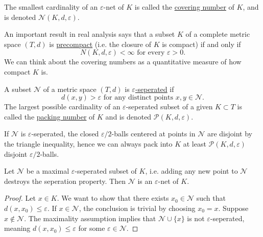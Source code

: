 \begin{definition}[]
\label{def:4.2.2}
The smallest cardinality of an $\varepsilon$-net of $K$ is called the \underline{covering number} of 
$K$, and is denoted $\mathcal{N}(K, d, \varepsilon)$.
\end{definition}

\begin{remark}[Compactness]
\label{rmk:4.2.3}
An important result in real analysis says that a subset $K$ of a complete metric space $(T, d)$ is 
\underline{precompact} (i.e. the closure of $K$ is compact) if and only if
\[ N(K, d, \varepsilon) < \infty \text{ for every } \varepsilon > 0. \]
We can think about the covering numbers as a quantitative measure of how compact $K$ is.
\end{remark}

\begin{definition}[]
\label{def:4.2.4}
A subset $\mathcal{N}$ of a metric space $(T, d)$ is \underline{$\varepsilon$-seperated} if 
\[ d(x, y) > \varepsilon \text{ for any distinct points } x, y \in \mathcal{N}. \]
The largest possible cardinality of an $\varepsilon$-seperated subset of a given $K \subset T$ is called 
the \underline{packing number} of $K$ and is denoted $\mathcal{P}(K, d, \varepsilon)$.
\end{definition}

\begin{remark}
\label{rmk:4.2.5}
If $\mathcal{N}$ is $\varepsilon$-seperated, the closed $\varepsilon / 2$-balls centered at points in 
$\mathcal{N}$ are disjoint by the triangle inequality, hence we can always pack into $K$ at least 
$\mathcal{P}(K, d, \varepsilon)$ disjoint $\varepsilon / 2$-balls.
\end{remark}

\begin{lemma}
\label{lem:4.2.6}
Let $\mathcal{N}$ be a maximal $\varepsilon$-seperated subset of $K$, i.e. adding any new point to $\mathcal{N}$ 
destroys the seperation property. Then $\mathcal{N}$ is an $\varepsilon$-net of $K$.
\end{lemma}

\begin{proof}
Let $x \in K$. We want to show that there exists $x_0 \in \mathcal{N}$ such that $d(x, x_0) \leq \varepsilon$. 
If $x \in \mathcal{N}$, the conclusion is trivial by choosing $x_0 = x$. Suppose $x \notin \mathcal{N}$. 
The maximality assumption implies that $\mathcal{N} \cup \{x\}$ is not $\varepsilon$-seperated, meaning 
$d(x, x_0) \leq \varepsilon$ for some $\varepsilon \in \mathcal{N}$.
\end{proof}


